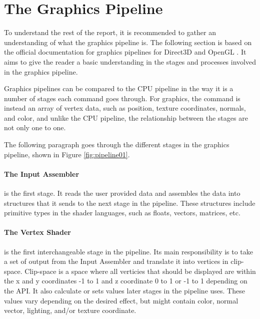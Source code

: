 \section{The Graphics Pipeline} \label{sec:pipeline}
\begin{sectionmeta}
To understand the rest of the report, it is recommended to gather an understanding of what the graphics pipeline is.
The following section is based on the official documentation for graphics pipelines for Direct3D and OpenGL \cite{khronos????pipeline, microsoft????pipeline}.
It aims to give the reader a basic understanding in the stages and processes involved in the graphics pipeline.
\end{sectionmeta}

Graphics pipelines can be compared to the \gls{CPU} pipeline in the way it is a number of stages each command goes through.
For graphics, the command is instead an array of vertex data, such as position, texture coordinates, normals, and color, and unlike the \gls{CPU} pipeline, the relationship between the stages are not only one to one.


The following paragraph goes through the different stages in the graphics pipeline, shown in Figure \ref{fig:pipeline01}.

\paragraph{The Input Assembler} is the first stage. 
It reads the user provided data and assembles the data into structures that it sends to the next stage in the pipeline.
These structures include primitive types in the shader languages, such as floats, vectors, matrices, etc.

\paragraph{The Vertex Shader} is the first interchangeable stage in the pipeline.
Its main responsibility is to take a set of output from the Input Assembler and translate it into vertices in clip-space.
Clip-space is a space where all verticies that should be displayed are within the x and y coordinates -1 to 1 and z coordinate 0 to 1 or -1 to 1 depending on the \gls{API}.
It also calculate or sets values later stages in the pipeline uses.
These values vary depending on the desired effect, but might contain color, normal vector, lighting, and/or texture coordinate.


